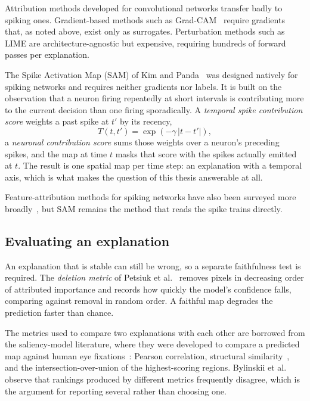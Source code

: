 Attribution methods developed for convolutional networks transfer badly to
spiking ones. Gradient-based methods such as Grad-CAM~\cite{selvaraju2017gradcam}
require gradients that, as noted above, exist only as surrogates. Perturbation
methods such as LIME are architecture-agnostic but expensive, requiring hundreds
of forward passes per explanation.

The Spike Activation Map (SAM) of Kim and Panda~\cite{kim2021sam} was designed
natively for spiking networks and requires neither gradients nor labels. It is
built on the observation that a neuron firing repeatedly at short intervals is
contributing more to the current decision than one firing sporadically. A
\emph{temporal spike contribution score} weights a past spike at $t'$ by its
recency,
\begin{equation}
T(t, t') = \exp\left(-\gamma\,|t - t'|\right),
\end{equation}
a \emph{neuronal contribution score} sums those weights over a neuron's
preceding spikes, and the map at time $t$ masks that score with the spikes
actually emitted at $t$. The result is one spatial map per time step: an
explanation with a temporal axis, which is what makes the question of this thesis
answerable at all.

Feature-attribution methods for spiking networks have also been surveyed more
broadly~\cite{nguyen2023attribution}, but SAM remains the method that reads the
spike trains directly.

\subsection{Evaluating an explanation}

An explanation that is stable can still be wrong, so a separate faithfulness
test is required. The \emph{deletion metric} of Petsiuk et
al.~\cite{petsiuk2018rise} removes pixels in decreasing order of attributed
importance and records how quickly the model's confidence falls, comparing
against removal in random order. A faithful map degrades the prediction faster
than chance.

The metrics used to compare two explanations with each other are borrowed from
the saliency-model literature, where they were developed to compare a predicted
map against human eye fixations~\cite{bylinskii2019metrics}: Pearson
correlation, structural similarity~\cite{wang2004ssim}, and the
intersection-over-union of the highest-scoring regions. Bylinskii et al. observe
that rankings produced by different metrics frequently disagree, which is the
argument for reporting several rather than choosing one.

